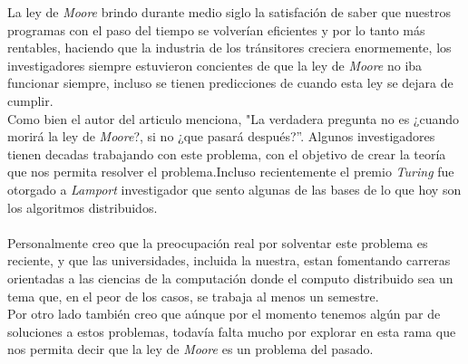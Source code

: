 \documentclass{article}
\begin{document}
\begin{enumerate}
{    La ley de \textit{Moore} brindo durante medio siglo la satisfación
    de saber que nuestros programas con el paso del tiempo se volverían
    eficientes y por lo tanto más rentables, haciendo que la industria
    de los tránsitores creciera enormemente, los investigadores
    siempre estuvieron concientes de que la ley de \textit{Moore} no
    iba funcionar siempre, incluso se tienen predicciones de cuando
    esta ley se dejara de cumplir.\\
    Como bien el autor del articulo menciona, "La verdadera pregunta no
    es ¿cuando morirá la ley de \textit{Moore}?, si no ¿que pasará
    después?''. Algunos investigadores tienen decadas trabajando con
    este problema, con el objetivo de crear la teoría que nos permita
    resolver el problema.Incluso recientemente el premio
    \textit{Turing} fue otorgado a \textit{Lamport} investigador que
    sento algunas de las bases de lo que hoy son los algoritmos
    distribuidos.\\ \\
    Personalmente creo que la preocupación real por solventar este
    problema es reciente, y que las universidades, incluida la
    nuestra, estan fomentando carreras orientadas a las ciencias de la
    computación donde el computo distribuido sea un tema que, en el
    peor de los casos, se trabaja  al menos un semestre.\\
    Por otro lado también creo que aúnque por el momento tenemos algún
    par de soluciones a estos problemas, todavía falta mucho por
    explorar en esta rama que nos permita decir que la ley de
    \textit{Moore} es un problema del pasado.
  }
  
\end{enumerate}
\end{document}
